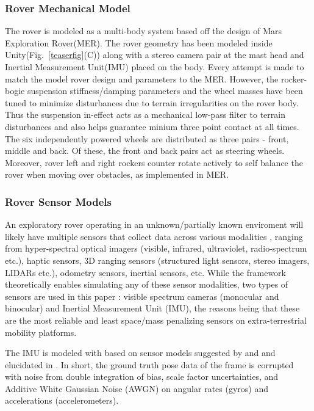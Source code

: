 \documentclass[a4paper, 10pt, conference]{ieeeconf}      %
\begin{document}
\subsubsection{Rover Mechanical Model}
The rover is modeled as a multi-body system based off the design of Mars Exploration Rover(MER). The rover geometry has been modeled inside Unity(Fig.~\ref{teaserfig}(C)) along with a stereo camera pair at the mast head and Inertial Measurement Unit(IMU) placed on the body. Every attempt is made to match the model rover design and parameters to the MER\cite{crisp2003mars,maki2003mars}. However, the rocker-bogie suspension stiffness/damping parameters and the wheel masses have been tuned to minimize disturbances due to terrain irregularities on the rover body. Thus the suspension in-effect acts as a mechanical low-pass filter to terrain disturbances and also helps guarantee minium three point contact at all times. The six independently powered wheels are distributed as three pairs - front, middle and back. Of these, the front and back pairs act as steering wheels. Moreover, rover left and right rockers counter rotate actively to self balance the rover when moving over obstacles, as implemented in MER.
\subsubsection{Rover Sensor Models}
An exploratory rover operating in an unknown/partially known enviroment will likely have multiple sensors that collect data across various modalities \cite{borenstein1997mobile,ruocco2013robot}, ranging from hyper-spectral optical imagers (visible, infrared, ultraviolet, radio-spectrum etc.), haptic sensors, 3D ranging sensors (structured light sensors, stereo imagers, LIDARs etc.), odometry sensors, inertial sensors, etc. While the framework theoretically enables simulating any of these sensor modalities, two types of sensors are used in this paper : visible spectrum cameras (monocular and binocular)  and Inertial Measurement Unit (IMU), the reasons being that these are the most reliable and least space/mass penalizing sensors on extra-terrestrial mobility platforms. 

The IMU is modeled with based on sensor models suggested by \cite{savage1998strapdown1} and \cite{savage1998strapdown2} and elucidated in \cite{titterton2004strapdown}. In short, the ground truth pose data of the frame is corrupted with noise from double integration of bias, scale factor uncertainties, and Additive White Gaussian Noise (AWGN) on angular rates (gyros) and accelerations (accelerometers).
\end{document}
